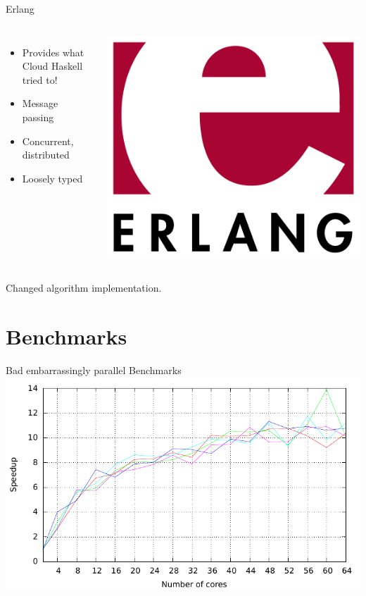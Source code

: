 \documentclass[14pt]{beamer}
\begin{document}
\begin{frame}{Erlang}
    \begin{columns}
        \begin{itemize}
            \item<1> Provides what Cloud Haskell tried to!
            \item<1> Message passing
            \item<1> Concurrent, distributed
            \item Loosely typed
        \end{itemize}
        \includegraphics[width=\textwidth]{images/erlang-logo.pdf}
    \end{columns}
    \pause
    \vspace{2cm}
    Changed algorithm implementation.
\end{frame}

\section{Benchmarks}

\begin{frame}{Bad embarrassingly parallel Benchmarks}
    \pause
        \includegraphics[width=\textwidth]{images/bad_speedup.pdf}
\end{frame}
\end{document}
